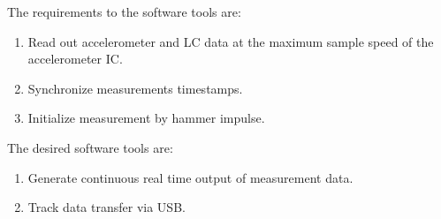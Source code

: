 The requirements to the software tools are:
\begin{enumerate}[label=\emph{m\arabic*}, itemindent=3em, labelsep=2em]
  \item Read out accelerometer and \ac{LC} data at the maximum sample speed of the accelerometer \ac{IC}.\label{req:read_out}
  \item Synchronize measurements timestamps.\label{req:sync}
  \item Initialize measurement by hammer impulse.\label{req:init}
\end{enumerate}

The desired software tools are:
\begin{enumerate}[label=\emph{w\arabic*}, itemindent=3em, labelsep=2em]
  \item Generate continuous real time output of measurement data.\label{des:cont_out}
  \item Track data transfer via \ac{USB}.\label{des:dat_track}
\end{enumerate}


